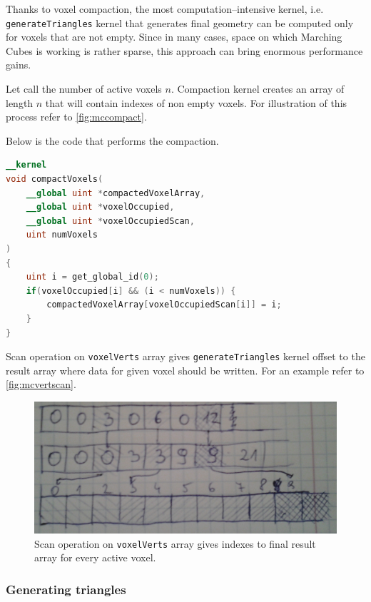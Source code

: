 Thanks to voxel compaction, the most computation--intensive kernel, i.e.
\texttt{generateTriangles} kernel that generates final geometry can be computed
only for voxels that are not empty. Since in many cases, space on which Marching
Cubes is working is rather sparse, this approach can bring enormous performance
gains.

Let call the number of active voxels $n$. Compaction kernel creates an array
of length $n$ that will contain indexes of non empty voxels. For illustration of
this process refer to \autoref{fig:mccompact}.

Below is the code that performs the compaction.
\begin{lstlisting}[language=opencl]
__kernel
void compactVoxels(
	__global uint *compactedVoxelArray,
	__global uint *voxelOccupied,
	__global uint *voxelOccupiedScan,
	uint numVoxels
)
{
	uint i = get_global_id(0);
	if(voxelOccupied[i] && (i < numVoxels)) {
		compactedVoxelArray[voxelOccupiedScan[i]] = i;
	}
}
\end{lstlisting}

Scan operation on \texttt{voxelVerts} array gives \texttt{generateTriangles}
kernel offset to the result array where data for given voxel should be written.
For an example refer to \autoref{fig:mcvertscan}.

\begin{figure}[b]
	\begin{center}
		\includegraphics[width=\textwidth]{chapters/marchingcubes/vertscan.jpg}
	\end{center}
	\caption{Scan operation on \texttt{voxelVerts} array gives indexes to
		final result array for every active voxel.
	}
	\label{fig:mcvertscan}
\end{figure}

\subsubsection{Generating triangles}

